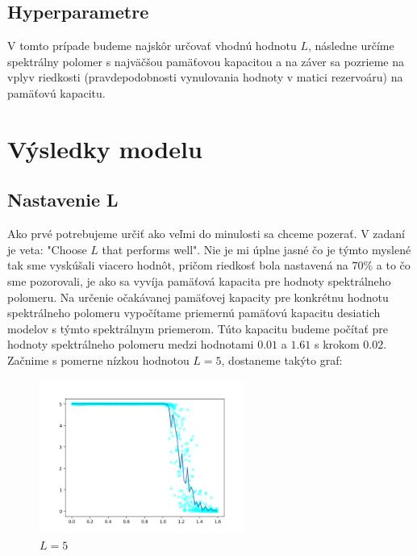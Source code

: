 \documentclass[a4paper]{article}
\begin{document}
	\subsection*{Hyperparametre}
	
	V tomto prípade budeme najskôr určovať vhodnú hodnotu $L$, následne určíme spektrálny polomer s najväčšou pamäťovou kapacitou a na záver sa pozrieme na vplyv riedkosti (pravdepodobnosti vynulovania hodnoty v matici rezervoáru) na pamäťovú kapacitu. 
	
	\section{Výsledky modelu}
	
	\subsection*{Nastavenie L}
	
	Ako prvé potrebujeme určiť ako veľmi do minulosti sa chceme pozerať. V zadaní je veta: "Choose $L$ that performs well". Nie je mi úplne jasné čo je týmto myslené tak sme vyskúšali viacero hodnôt, pričom riedkosť bola nastavená na $70\%$ a to čo sme pozorovali, je ako sa vyvíja pamäťová kapacita pre hodnoty spektrálneho polomeru. Na určenie očakávanej pamäťovej kapacity pre konkrétnu hodnotu spektrálneho polomeru vypočítame priemernú pamäťovú kapacitu desiatich modelov s týmto spektrálnym priemerom. Túto kapacitu budeme počítať pre hodnoty spektrálneho polomeru medzi hodnotami $0.01$ a $1.61$ s krokom $0.02$.
	\\
	
	Začnime s pomerne nízkou hodnotou $L=5$, dostaneme takýto graf:
	
	\begin{figure}[!h]
		\centering
		\includegraphics[width=0.6\textwidth]{../L_5.png}
		\caption{$L=5$}
	\end{figure}
	
\end{document}
